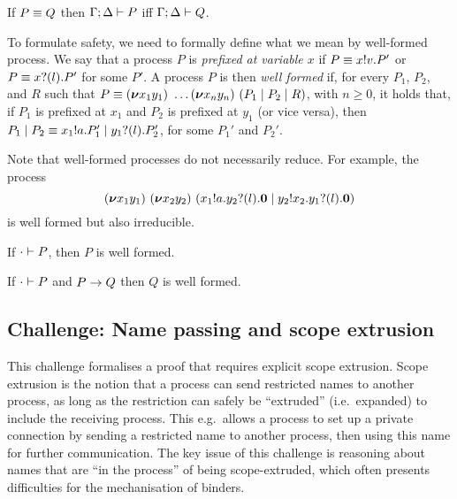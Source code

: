 \documentclass[runningheads]{llncs}
\begin{document}
\begin{lemma}
  \label{le:presequiv}
    If \( P \equiv Q \) then \( \Gamma;\Delta \vdash P \)  iff \( \Gamma;\Delta \vdash Q \).
\end{lemma}

To formulate safety, we need to formally define what we mean by
well-formed process.  We say that a process \( P \) is \emph{prefixed
  at variable \( x \)} if \( P\equiv x ! v . P' \) or
\( P\equiv x ? (l) . P' \) for some $P'$.
%
A process $P$ is then \emph{well formed} if, for every $P_1$, $P_2$,
and $R$ such that
\( P\equiv (\bm{\nu} x_1y_1)~\dots
  (\bm{\nu} x_ny_n)~(P_1 \mid P_2 \mid R) \), with
\( n \geq 0 \), it holds that, if \( P_1 \) is prefixed at \( x_1 \)
and \( P_2 \) is prefixed at \( y_1 \) (or vice versa), then
\( P_1 \mid P_2
\equiv x_1 ! a . P_1' \mid y_1 ? (l) . P_2' \), for some
$P_1'$ and $P_2'$.

Note that well-formed processes do not necessarily reduce. For example, the process
\begin{equation*}
  (\bm{\nu} x_1y_1)~(\bm{\nu} x_2y_2)~(x_1 ! a . y_2 ? (l) . \bm{0} \mid y_2 ! x_2 . y_1 ? (l) . \bm{0})
\end{equation*}
is well formed but also irreducible.

\begin{theorem}
  If \( \cdot \vdash P \), then \( P \) is well formed.
\end{theorem}

\begin{corollary}
  If \( \cdot \vdash P \) and \( P \rightarrow Q \) then \( Q \) is well formed.
\end{corollary}

\subsection{Challenge: Name passing and scope extrusion}
\label{sec:challenge:name-passing-scope-extrusion}

This challenge formalises a proof that requires explicit scope extrusion.
Scope extrusion is the notion that a process can send restricted names to another process, as long as the restriction can safely be ``extruded'' (i.e.\ expanded) to include the receiving process.
This e.g.\ allows a process to set up a private connection by sending a restricted name to another process, then using this name for further communication.
The key issue of this challenge is reasoning about names that are ``in the process'' of being scope-extruded, which often presents difficulties for the mechanisation of binders.
\end{document}
